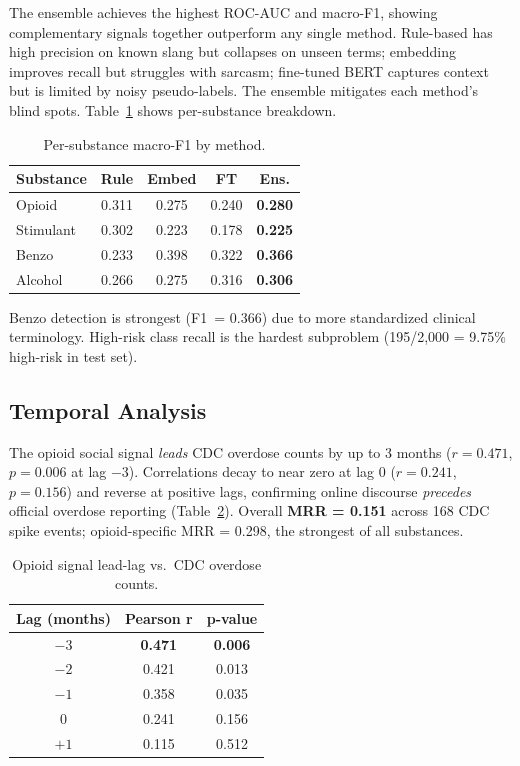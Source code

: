 \documentclass[10pt,twocolumn]{article}
\begin{document}
The ensemble achieves the highest ROC-AUC and macro-F1, showing complementary signals together outperform any single method. Rule-based has high precision on known slang but collapses on unseen terms; embedding improves recall but struggles with sarcasm; fine-tuned BERT captures context but is limited by noisy pseudo-labels. The ensemble mitigates each method's blind spots. Table~\ref{tab:substance} shows per-substance breakdown.

\begin{table}[H]
\centering
\caption{Per-substance macro-F1 by method.}
\label{tab:substance}
\scriptsize
\begin{tabular}{@{}lcccc@{}}
  \toprule
  \textbf{Substance} & \textbf{Rule} & \textbf{Embed} & \textbf{FT} & \textbf{Ens.} \\
  \midrule
  Opioid    & 0.311 & 0.275 & 0.240 & \textbf{0.280} \\
  Stimulant & 0.302 & 0.223 & 0.178 & \textbf{0.225} \\
  Benzo     & 0.233 & 0.398 & 0.322 & \textbf{0.366} \\
  Alcohol   & 0.266 & 0.275 & 0.316 & \textbf{0.306} \\
  \bottomrule
\end{tabular}
\end{table}

Benzo detection is strongest (F1~= 0.366) due to more standardized clinical terminology. High-risk class recall is the hardest subproblem (195/2,000 = 9.75\% high-risk in test set).

\subsection*{Temporal Analysis}

The opioid social signal \emph{leads} CDC overdose counts by up to 3 months ($r = 0.471$, $p = 0.006$ at lag $-3$). Correlations decay to near zero at lag 0 ($r = 0.241$, $p = 0.156$) and reverse at positive lags, confirming online discourse \emph{precedes} official overdose reporting (Table~\ref{tab:leadlag}). Overall \textbf{MRR = 0.151} across 168 CDC spike events; opioid-specific MRR = 0.298, the strongest of all substances.

\begin{table}[H]
\centering
\caption{Opioid signal lead-lag vs.\ CDC overdose counts.}
\label{tab:leadlag}
\scriptsize
\begin{tabular}{@{}ccc@{}}
  \toprule
  \textbf{Lag (months)} & \textbf{Pearson r} & \textbf{p-value} \\
  \midrule
  $-3$ & \textbf{0.471} & \textbf{0.006} \\
  $-2$ & 0.421 & 0.013 \\
  $-1$ & 0.358 & 0.035 \\
  $0$  & 0.241 & 0.156 \\
  $+1$ & 0.115 & 0.512 \\
  \bottomrule
\end{tabular}
\end{table}
\end{document}
